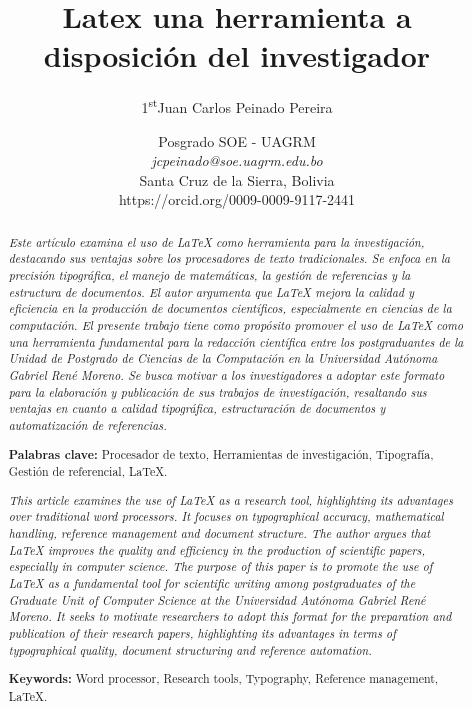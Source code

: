 \documentclass[10pt,twocolumn]{article}
\title{\Huge Latex una herramienta a disposición del investigador\\}
\author{\Large {1\textsuperscript{st}Juan Carlos Peinado Pereira}}
\date{\normalsize Posgrado SOE - UAGRM\\
\textit{jcpeinado@soe.uagrm.edu.bo}\\
Santa Cruz de la Sierra, Bolivia \\
https://orcid.org/0009-0009-9117-2441}
\begin{document}
\maketitle

\titlespacing*{\section}{0pt}{0.5cm}{0.5cm}

\begin{abstract}
    \textit{\normalsize Este artículo examina el uso de LaTeX como herramienta para la investigación, destacando sus ventajas sobre los procesadores de texto tradicionales. 
    Se enfoca en la precisión tipográfica, el manejo de matemáticas, la gestión de referencias y la estructura de documentos. 
    El autor argumenta que LaTeX mejora la calidad y eficiencia en la producción de documentos científicos, especialmente en ciencias de la computación. 
    El presente trabajo tiene como propósito promover el uso de LaTeX como una herramienta fundamental para la redacción científica entre los postgraduantes de la Unidad de Postgrado de Ciencias de la Computación en la Universidad Autónoma Gabriel René Moreno. 
    Se busca motivar a los investigadores a adoptar este formato para la elaboración y publicación de sus trabajos de investigación, resaltando sus ventajas en cuanto a calidad tipográfica, estructuración de documentos y automatización de referencias.} 
    \vspace{0.5cm}

    \textbf{Palabras clave:} Procesador de texto, Herramientas de investigación, Tipografía, Gestión de referencial, LaTeX.
\end{abstract}


\begin{abstract}
    \textit{\normalsize This article examines the use of LaTeX as a research tool, highlighting its advantages over traditional word processors. 
    It focuses on typographical accuracy, mathematical handling, reference management and document structure. 
    The author argues that LaTeX improves the quality and efficiency in the production of scientific papers, especially in computer science. 
    The purpose of this paper is to promote the use of LaTeX as a fundamental tool for scientific writing among postgraduates of the Graduate Unit of Computer Science at the Universidad Autónoma Gabriel René Moreno. 
    It seeks to motivate researchers to adopt this format for the preparation and publication of their research papers, highlighting its advantages in terms of typographical quality, document structuring and reference automation. }    
    \vspace{0.5cm}

    \textbf{Keywords:} Word processor, Research tools, Typography, Reference management, LaTeX.
\end{abstract}
\end{document}
